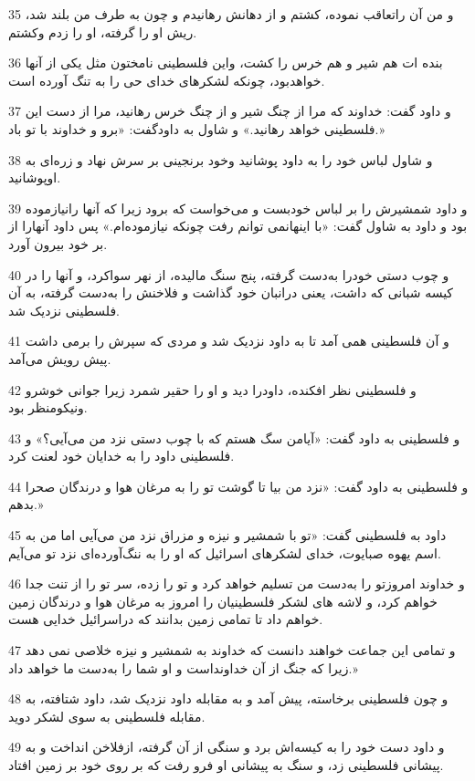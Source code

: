 \par 35 و من آن راتعاقب نموده، کشتم و از دهانش رهانیدم و چون به طرف من بلند شد، ریش او را گرفته، او را زدم وکشتم.
\par 36 بنده ات هم شیر و هم خرس را کشت، واین فلسطینی نامختون مثل یکی از آنها خواهدبود، چونکه لشکرهای خدای حی را به تنگ آورده است.
\par 37 و داود گفت: خداوند که مرا از چنگ شیر و از چنگ خرس رهانید، مرا از دست این فلسطینی خواهد رهانید.» و شاول به داودگفت: «برو و خداوند با تو باد.» 
\par 38 و شاول لباس خود را به داود پوشانید وخود برنجینی بر سرش نهاد و زره‌ای به اوپوشانید.
\par 39 و داود شمشیرش را بر لباس خودبست و می‌خواست که برود زیرا که آنها رانیازموده بود و داود به شاول گفت: «با اینهانمی توانم رفت چونکه نیازموده‌ام.» پس داود آنهارا از بر خود بیرون آورد.
\par 40 و چوب دستی خودرا به‌دست گرفته، پنج سنگ مالیده، از نهر سواکرد، و آنها را در کیسه شبانی که داشت، یعنی درانبان خود گذاشت و فلاخنش را به‌دست گرفته، به آن فلسطینی نزدیک شد.
\par 41 و آن فلسطینی همی آمد تا به داود نزدیک شد و مردی که سپرش را برمی داشت پیش رویش می‌آمد.
\par 42 و فلسطینی نظر افکنده، داودرا دید و او را حقیر شمرد زیرا جوانی خوشرو ونیکومنظر بود.
\par 43 و فلسطینی به داود گفت: «آیامن سگ هستم که با چوب دستی نزد من می‌آیی؟» و فلسطینی داود را به خدایان خود لعنت کرد.
\par 44 و فلسطینی به داود گفت: «نزد من بیا تا گوشت تو را به مرغان هوا و درندگان صحرا بدهم.»
\par 45 داود به فلسطینی گفت: «تو با شمشیر و نیزه و مزراق نزد من می‌آیی اما من به اسم یهوه صبایوت، خدای لشکرهای اسرائیل که او را به ننگ‌آورده‌ای نزد تو می‌آیم.
\par 46 و خداوند امروزتو را به‌دست من تسلیم خواهد کرد و تو را زده، سر تو را از تنت جدا خواهم کرد، و لاشه های لشکر فلسطینیان را امروز به مرغان هوا و درندگان زمین خواهم داد تا تمامی زمین بدانند که دراسرائیل خدایی هست.
\par 47 و تمامی این جماعت خواهند دانست که خداوند به شمشیر و نیزه خلاصی نمی دهد زیرا که جنگ از آن خداونداست و او شما را به‌دست ما خواهد داد.»
\par 48 و چون فلسطینی برخاسته، پیش آمد و به مقابله داود نزدیک شد، داود شتافته، به مقابله فلسطینی به سوی لشکر دوید.
\par 49 و داود دست خود را به کیسه‌اش برد و سنگی از آن گرفته، ازفلاخن انداخت و به پیشانی فلسطینی زد، و سنگ به پیشانی او فرو رفت که بر روی خود بر زمین افتاد.

